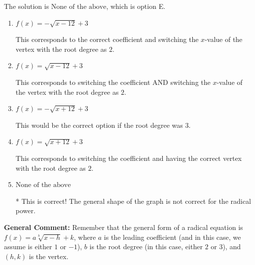 \documentclass{extbook}[14pt]
\begin{document}
\begin{enumerate}
{The solution is \( \text{None of the above} \), which is option E.\begin{enumerate}[label=\Alph*.]
\item \( f(x) = - \sqrt{x - 12} + 3 \)

This corresponds to the correct coefficient and switching the $x$-value of the vertex with the root degree as $2$.
\item \( f(x) = \sqrt{x - 12} + 3 \)

This corresponds to switching the coefficient AND switching the $x$-value of the vertex with the root degree as $2$.
\item \( f(x) = - \sqrt{x + 12} + 3 \)

This would be the correct option if the root degree was $3$.
\item \( f(x) = \sqrt{x + 12} + 3 \)

This corresponds to switching the coefficient and having the correct vertex with the root degree as $2$.
\item \( \text{None of the above} \)

* This is correct! The general shape of the graph is not correct for the radical power.
\end{enumerate}

\textbf{General Comment:} Remember that the general form of a radical equation is $ f(x) = a \sqrt[b]{x - h} + k$, where $a$ is the leading coefficient (and in this case, we assume is either $1$ or $-1$), $b$ is the root degree (in this case, either $2$ or $3$), and $(h, k)$ is the vertex.
}
\end{enumerate}
\end{document}

